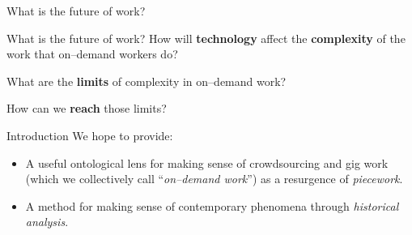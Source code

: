 \documentclass[presentation]{subfiles}
\begin{document}
\begin{frame}[standout]
    What is the future of work?
\end{frame}

\begin{frame}{What is the future of work?}
    How will \textbf{technology} affect the \textbf{complexity} of the work that on--demand workers do?

    What are the \textbf{limits} of complexity in on--demand work?

    How can we \textbf{reach} those limits?
\end{frame}


\notinsubfile{
}

\begin{frame}{Introduction}
  We hope to provide:
      \begin{itemize}
        \item A useful ontological lens for making sense of crowdsourcing and gig work (which we collectively call ``\textit{on--demand work}'') as a resurgence of \textit{piecework}.
        \item A method for making sense of contemporary phenomena through \textit{historical analysis}.
      \end{itemize}
\end{frame}
\end{document}
